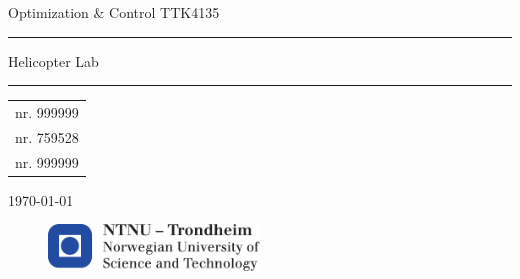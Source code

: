 
\begin{titlepage}
    \begin{center}
    	\large
    	Optimization \& Control TTK4135
    \end{center}
    \vspace{\fill}
    \rule{\linewidth}{0.5mm}
    \begin{center}
    	\huge
    	Helicopter Lab
    \end{center}
	\rule{\linewidth}{0.5mm}
	\vspace{\fill}

    \large
    \centering
    \begin{table}[H]
    	\centering
    	\large
    	\begin{tabular}{c}
            nr. 999999\\
    		nr. 759528\\
            nr. 999999
    	\end{tabular}
    \end{table}
    \vspace{\fill}
    \begin{center}
    	\large
    	\today
    \end{center}
	\vspace{\fill}
    \begin{figure}[H]
    \centering
    \includegraphics[width=0.5\textwidth]{logontnu_eng}
    \end{figure}
    \thispagestyle{empty}
\end{titlepage}
